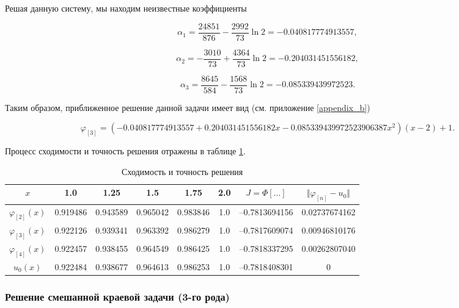 \documentclass{article}
\begin{document}
\noindent Решая данную систему, мы находим неизвестные коэффициенты

\begin{displaymath}
	\alpha_{1} = \frac{24851}{876} - \frac{2992}{73} \ln{2} = -0.040817774913557,
\end{displaymath}

\begin{displaymath}	
	\alpha_{2} = -\frac{3010}{73} + \frac{4364}{73} \ln{2} = -0.204031451556182, 
\end{displaymath}

\begin{displaymath}
	\alpha_{3} = \frac{8645}{584} - \frac{1568}{73} \ln{2} = -0.085339439972523.
\end{displaymath}

Таким образом, приближенное решение данной задачи имеет вид (см. приложение \ref{appendix_b})

\begin{displaymath}	
	\varphi_{[3]} = (-0.040817774913557+0.204031451556182x -0.085339439972523906387x^2)(x-2) + 1.
\end{displaymath}

\noindent Процесс сходимости и точность решения отражены в таблице \ref{table_process_of_convergence_rank_2}.

\begin{table}[!h]
\centering
\begin{tabular}{|c|c|c|c|c|c|c|c|}
	\hline
	$x$ & 1.0 & 1.25 & 1.5 & 1.75 & 2.0 & $J = \Phi[\ldots]$ & $\Vert \varphi_{[n]} - u_{0} \Vert$ \\
	\hline \hline

	$\varphi_{[2]}(x)$ & 0.919486 & 0.943589 & 0.965042 & 0.983846 & 1.0 & –0.7813694156 & 0.02737674162 \\	\hline
	$\varphi_{[3]}(x)$ & 0.922126 & 0.939341 & 0.963392 & 0.986279 & 1.0 & –0.7817609074 & 0.00946810176 \\	\hline
	$\varphi_{[4]}(x)$ & 
0.922457 & 0.938455 & 0.964549 & 0.986425 & 1.0 & –0.7818337295 & 0.00262807040 \\	\hline
	$u_{0}(x)$ & 0.922484 & 0.938677 & 0.964613 & 0.986253 & 1.0 & –0.7818408301 & 0 \\	\hline

\end{tabular}
\caption{Сходимость и точность решения}
\label{table_process_of_convergence_rank_2}
\end{table}

\subsubsection{Решение смешанной краевой задачи (3-го рода)}
\end{document}
